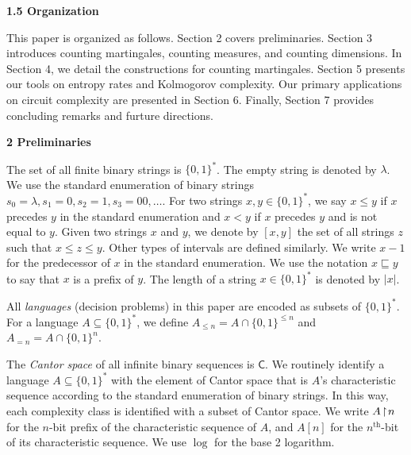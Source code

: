 \documentclass[10pt,a4paper]{article}
\begin{document}
\par\medskip\noindent\textbf{
1.5 Organization}\par




This paper is organized as follows. Section 2 covers preliminaries. Section 3 introduces counting martingales, counting measures, and counting dimensions. In Section 4, we detail the constructions for counting martingales. Section 5 presents our tools on entropy rates and Kolmogorov complexity. Our primary applications on circuit complexity are presented in Section 6. Finally, Section 7 provides concluding remarks and furture directions.\par






\par\medskip\noindent\textbf{
2 Preliminaries}\par




The set of all finite binary strings is $\{0,1\}^{*}$. The empty string
is denoted by $\lambda$. We use the standard enumeration of binary
strings $s_{0}=\lambda,s_{1}=0,s_{2}=1,s_{3}=00,\ldots$. For two
strings $x,y\in\{0,1\}^{*}$, we say $x\leq y$ if $x$ precedes $y$ in
the standard enumeration and $x<y$ if $x$ precedes $y$ and is not
equal to $y$. Given two strings $x$ and $y$, we denote by $[x,y]$ the set of all strings $z$ such that $x\leq z\leq y$. Other types of intervals are defined similarly.
We write $x-1$ for the predecessor
of $x$ in the standard enumeration. We use the notation $x\sqsubseteq y$ to say that
$x$ is a prefix of $y$. The length of a string $x\in\{0,1\}^{*}$ is
denoted by $|x|$.\par




All \emph{languages} (decision problems) in this paper are encoded as
subsets of $\{0,1\}^{*}$. For a language $A\subseteq\{0,1\}^{*}$, we
define $A_{\leq n}=A\cap\{0,1\}^{\leq n}$ and $A_{=n}=A\cap\{0,1\}^{n}$.\par




The \emph{Cantor space} of all infinite binary sequences is $\mathsf{C}$. We
routinely identify a language $A\subseteq\{0,1\}^{*}$ with the element of Cantor space that is $A$’s characteristic sequence according to the
standard enumeration of binary strings. In this way, each complexity
class is identified with a subset of Cantor space. We write $A\negthinspace\upharpoonright\negthinspace n$ for the $n$-bit prefix of the characteristic sequence of $A$, and
$A[n]$ for the $n^{\mathrm{th}}$-bit of its characteristic sequence.
We use $\log$ for the base 2 logarithm.\par
\end{document}
